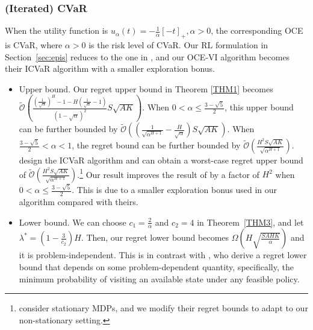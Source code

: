 \documentclass[11pt]{article}
\newcommand{\1}{\mathbbm{1}}
\newcommand{\gao}[1]{\textcolor{blue}{{#1}}} %
\begin{document}
\subsubsection{(Iterated) CVaR}
When the utility function is $u_{\alpha}(t)=-\frac{1}{\alpha}[-t]_{+},\alpha>0$, the corresponding OCE is CVaR, where $\alpha>0$ is the risk level of CVaR. Our RL formulation in Section~\ref{sec:epis} reduces to the one in \cite{du2022risk}, and our OCE-VI algorithm becomes their ICVaR algorithm with a smaller exploration bonus. 

\begin{itemize}
\item Upper bound. Our regret upper bound in Theorem \ref{THM1} becomes $\tilde{\mathcal{O}}\left(\frac{(\frac{1}{\sqrt{\alpha}})^H-1-H(\frac{1}{\sqrt{\alpha}}-1)}{(1-\sqrt{\alpha})^2}S\sqrt{AK}\right)$. When $0< \alpha\leq \frac{3-\sqrt{5}}{2}$, this upper bound can be further bounded by $\tilde{\mathcal{O}}\left(\left(\frac{1}{\sqrt{\alpha^{H+1}}}-\frac{H}{\sqrt{\alpha}}\right)S\sqrt{AK}\right)$. When $\frac{3-\sqrt{5}}{2}<\alpha< 1$, the regret bound can be further bounded by $\tilde{\mathcal{O}}\left(\frac{H^2 S\sqrt{AK}}{\sqrt{\alpha^{H+1}}}\right)$.
\cite{du2022risk} design the ICVaR algorithm and can obtain a worst-case regret upper bound of $\tilde{\mathcal{O}}\left(\frac{H^2 S\sqrt{AK}}{\sqrt{\alpha^{H+1}}}\right)$.\footnote{\cite{du2022risk} consider stationary MDPs, and we modify their regret bounds to adapt to our non-stationary setting. 
} 
Our result improves the result of \citep{du2022risk} by a factor of $H^2$ when $0< \alpha\leq \frac{3-\sqrt{5}}{2}$. This is due to a smaller exploration bonus used in our algorithm compared with theirs.  %
\item Lower bound. We can choose $c_1=\frac{2}{\alpha}$ and $c_2=4$ in Theorem~\ref{THM3}, and let $\lambda^* = \left(1-\frac{3}{c_2}\right)H$. Then,
our regret lower bound becomes $\Omega\left(H\sqrt{\frac{SAHK}{\alpha}}\right)$ and it is problem-independent. This is in contrast with \cite{du2022risk}, who derive a regret lower bound that depends on some problem-dependent quantity, specifically, the minimum probability of visiting an available state under any feasible policy. %


\end{itemize}
\end{document}
